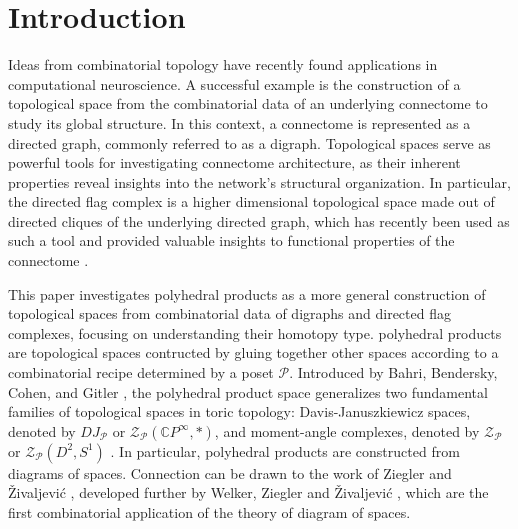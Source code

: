 \documentclass[a4paper,11pt]{article}
\newcommand{\pedro}[1]{{\color{orange}Pedro:\ #1}}
\theoremstyle{definition}
\newcommand{\C}{\mathbb{C}}
\newcommand{\PP}{\mathcal{P}}
\newcommand{\ZZ}{\mathcal{Z}}
\begin{document}
\section*{Introduction}

Ideas from combinatorial topology have recently found applications in computational neuroscience. A successful example is the construction of a topological space from the combinatorial data of an underlying connectome to study its global structure. In this context, a connectome is represented as a directed graph, commonly referred to as a digraph. Topological spaces serve as powerful tools for investigating connectome architecture, as their inherent properties reveal insights into the network's structural organization. In particular, the directed flag complex is a higher dimensional topological space made out of directed cliques of the underlying directed graph, which has recently been used as such a tool and provided valuable insights to functional properties of the connectome \cite{neidigraphs_network,bluebrain_paper}. 

This paper investigates polyhedral products as a  more general construction of topological spaces from combinatorial data of digraphs and directed flag complexes, focusing on understanding their homotopy type. polyhedral products are topological spaces contructed by gluing together other spaces according to a combinatorial recipe determined by a poset $\PP$. Introduced by Bahri, Bendersky, Cohen, and Gitler \cite{BBCG}, the polyhedral product space generalizes two fundamental families of topological spaces in toric topology: Davis-Januszkiewicz spaces, denoted by $DJ_\PP$ or $\ZZ_\PP(\C P^\infty,*)$, and moment-angle complexes, denoted by $\ZZ_\PP$ or $\ZZ_\PP(D^2,S^1)$ \cite{davis-januszkiewicz-seminal}. In particular, polyhedral products are constructed from diagrams of spaces. Connection can be drawn to the work of Ziegler and \v{Z}ivaljevi\'{c} \cite{homo-type-diagram}, developed further by Welker, Ziegler and \v{Z}ivaljevi\'{c} \cite{hocolim-comb}, which are the first combinatorial application of the theory of diagram of spaces.
\end{document}
